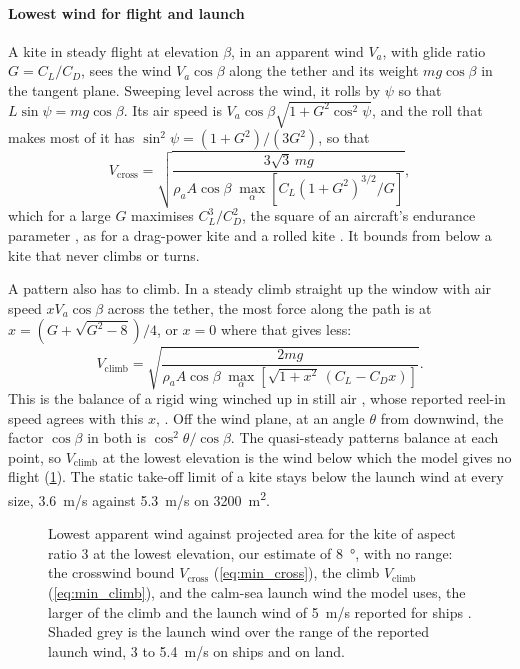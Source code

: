 \paragraph{Lowest wind for flight and launch}
\label{sec:det_min_wind}
A kite in steady flight at elevation $\beta$, in an apparent wind $V_a$, with glide ratio $G=C_L/C_D$, sees the wind $V_a\cos\beta$ along the tether and its weight $mg\cos\beta$ in the tangent plane. Sweeping level across the wind, it rolls by $\psi$ so that $L\sin\psi=mg\cos\beta$. Its air speed is $V_a\cos\beta\sqrt{1+G^2\cos^2\psi}$, and the roll that makes most of it has $\sin^2\psi=(1+G^2)/(3G^2)$, so that
\begin{equation}
V_\mathrm{cross} = \sqrt{\frac{3\sqrt{3}\,mg}{\rho_a A\cos\beta\;\max_\alpha\left[C_L(1+G^2)^{3/2}/G\right]}},
\label{eq:min_cross}
\end{equation}
which for a large $G$ maximises $C_L^3/C_D^2$, the square of an aircraft's endurance parameter \citep{echeverri2020part1}, as for a drag-power kite \citep{bauer2018} and a rolled kite \citep{luchsinger2013,joshi2024powercurve}.  It bounds from below a kite that never climbs or turns.

A pattern also has to climb. In a steady climb straight up the window with air speed $xV_a\cos\beta$ across the tether, the most force along the path is at $x=(G+\sqrt{G^2-8})/4$, or $x=0$ where that gives less:
\begin{equation}
V_\mathrm{climb} = \sqrt{\frac{2mg}{\rho_a A\cos\beta\;\max_\alpha\left[\sqrt{1+x^2}\,(C_L-C_D x)\right]}}.
\label{eq:min_climb}
\end{equation}
This is the balance of a rigid wing winched up in still air \citep{fagiano2017takeoff}, whose reported reel-in speed agrees with this $x$, . Off the wind plane, at an angle $\theta$ from downwind, the factor $\cos\beta$ in both is $\cos^2\theta/\cos\beta$. The quasi-steady patterns balance at each point, so $V_\mathrm{climb}$ at the lowest elevation is the wind below which the model gives no flight (\cref{fig:min_wind}). The static take-off limit of a kite \citep{joshi2024powercurve,bigi2018} stays below the launch wind at every size, \SI{3.6}{m/s} against \SI{5.3}{m/s} on \SI{3200}{m^2}.

\begin{figure}[tbp]
\centering
{}
\caption{Lowest apparent wind against projected area for the kite of aspect ratio 3 at the lowest elevation, our estimate of \SI{8}{\degree}, with no range: the crosswind bound $V_\mathrm{cross}$ (\cref{eq:min_cross}), the climb $V_\mathrm{climb}$ (\cref{eq:min_climb}), and the calm-sea launch wind the model uses, the larger of the climb and the launch wind of \SI{5}{m/s} reported for ships \citep{paulig2013}. Shaded grey is the launch wind over the range of the reported launch wind, 3 to \SI{5.4}{m/s} on ships and on land.}
\label{fig:min_wind}
\end{figure}


